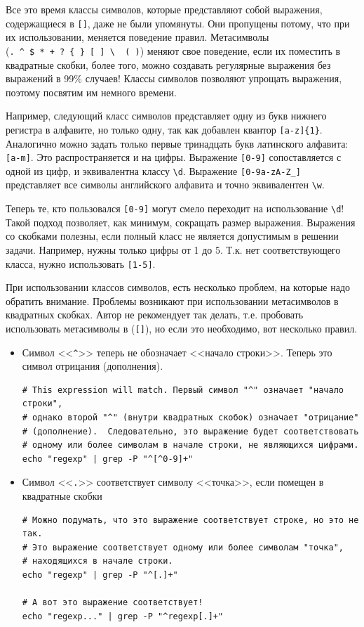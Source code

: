 \documentclass[12pt]{article}
\providecommand{\tightlist}{%
  \setlength{\itemsep}{0pt}\setlength{\parskip}{0pt}}
\begin{document}
Все это время классы
символов, которые представляют собой выражения, содержащиеся в
\texttt{{[}{]}}, даже не были упомянуты. Они пропущены потому, что при
их использовании, меняется поведение правил. Метасимволы
(\texttt{.\ \^{}\ \$\ *\ +\ ?\ \{\ \}\ {[}\ {]}\ \textbackslash{}\ \textbar{}\ (\ )})
меняют свое поведение, если их поместить в квадратные скобки, более
того, можно создавать регулярные выражения без выражений в 99\% случаев!
Классы символов позволяют упрощать выражения, поэтому посвятим им
немного времени.

Например, следующий класс символов представляет
одну из букв нижнего регистра в алфавите, но только одну, так как
добавлен квантор \texttt{{[}a-z{]}\{1\}}. Аналогично можно задать только
первые тринадцать букв латинского алфавита: \texttt{{[}a-m{]}}. Это распространяется и на
цифры. Выражение \texttt{{[}0-9{]}} сопоставляется с одной из цифр, и
эквивалентна классу \texttt{\textbackslash{}d}. Выражение
\texttt{{[}0-9a-zA-Z\_{]}} представляет все символы английского алфавита
и точно эквивалентен \texttt{\textbackslash{}w}.

Теперь те, кто пользовался \texttt{{[}0-9{]}} могут смело переходит на
использование \texttt{\textbackslash{}d}! Такой подход позволяет, как
минимум, сокращать размер выражения. Выражения со скобками полезны, если
полный класс не является допустимым в решении задачи. Например, нужны
только цифры от 1 до 5. Т.к. нет соответствующего класса, нужно
использовать \texttt{{[}1-5{]}}.

При использовании классов символов, есть несколько проблем, на которые
надо обратить внимание. Проблемы возникают при использовании метасимволов в квадратных скобках.
Автор не рекомендует так делать, т.е. пробовать использовать метасимволы в
(\texttt{{[}{]}}), но если это необходимо, вот несколько правил.
\begin{itemize}
\tightlist
\item
  Символ <<\texttt{\^{}}>> теперь не обозначает <<начало строки>>. Теперь это
  символ отрицания (дополнения).
\begin{verbatim}
# This expression will match. Первый символ "^" означает "начало строки",
# однако второй "^" (внутри квадратных скобок) означает "отрицание"
# (дополнение).  Следовательно, это выражение будет соответствовать
# одному или более символам в начале строки, не являющихся цифрами.
echo "regexp" | grep -P "^[^0-9]+"
\end{verbatim}
\item
  Символ <<\texttt{.}>> соответствует символу <<точка>>, если помещен в
  квадратные скобки
\begin{verbatim}
# Можно подумать, что это выражение соответствует строке, но это не так.
# Это выражение соответствует одному или более символам "точка",
# находящихся в начале строки.
echo "regexp" | grep -P "^[.]+"

# А вот это выражение соответствует!
echo "regexp..." | grep -P "^regexp[.]+"
\end{verbatim}
\end{itemize}
\end{document}
